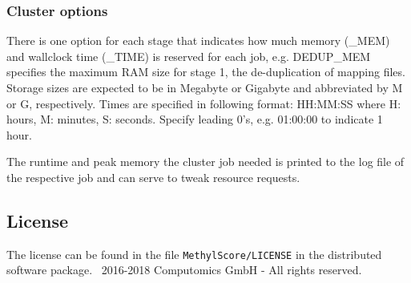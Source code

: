 \documentclass{article}
\begin{document}
\subsubsection*{Cluster options}

There is one option for each stage that indicates how much memory (\_MEM) and wallclock time (\_TIME) is reserved for each job, e.g. DEDUP\_MEM specifies the maximum RAM size for stage 1, the de-duplication of mapping files. Storage sizes are expected to be in Megabyte or Gigabyte and abbreviated by M or G, respectively. Times are specified in following format: HH:MM:SS where H: hours, M: minutes, S: seconds. Specify leading 0's, e.g. 01:00:00 to indicate 1 hour.

The runtime and peak memory the cluster job needed is printed to the log file of the respective job and can serve to tweak resource requests.

\subsection{License}

The license can be found in the file \verb,MethylScore/LICENSE, in the distributed software package.
\textcopyright~2016-2018 Computomics GmbH - All rights reserved.

\clearpage




\end{document}
